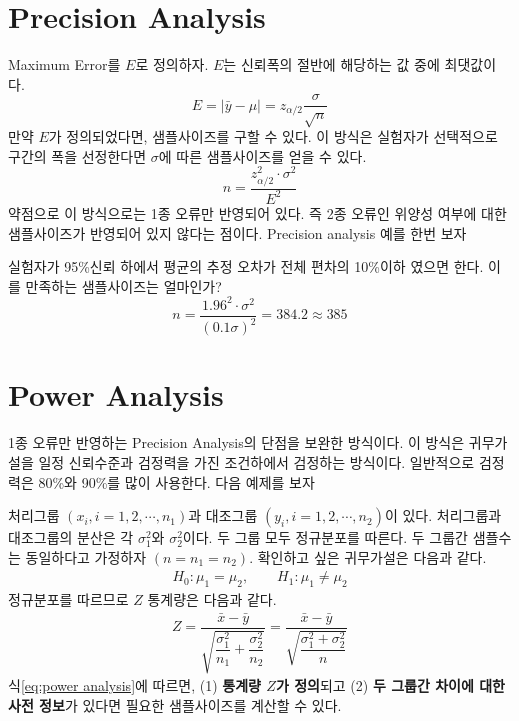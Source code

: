 \section{Precision Analysis}
Maximum Error를 $E$로 정의하자. $E$는 신뢰폭의 절반에 해당하는 값 중에 최댓값이다. 
\begin{equation}
    E = |\bar{y} - \mu| = z_{\alpha/2}\dfrac{\sigma}{\sqrt{n}}
\end{equation}
만약 $E$가 정의되었다면, 샘플사이즈를 구할 수 있다. 이 방식은 실험자가 선택적으로 구간의 폭을 선정한다면 $\sigma$에 따른 샘플사이즈를 얻을 수 있다. 
\begin{equation}
    n = \dfrac{z_{\alpha/2}^2\cdot \sigma^2}{E^2}
\end{equation}
약점으로 이 방식으로는 1종 오류만 반영되어 있다. 즉 2종 오류인 위양성 여부에 대한 샘플사이즈가 반영되어 있지 않다는 점이다. Precision analysis 예를 한번 보자 
\begin{tcolorbox}[arc=4mm, boxrule=0.1mm]
    [예제] 실험자가 95\%신뢰 하에서 평균의 추정 오차가 전체 편차의 10\%이하 였으면 한다. 이를 만족하는 샘플사이즈는 얼마인가? 
    \begin{equation*}
        n = \dfrac{1.96^2\cdot \sigma^2}{(0.1\sigma)^2} = 384.2 \approx 385
    \end{equation*}
\end{tcolorbox}
\section{Power Analysis}
1종 오류만 반영하는 Precision Analysis의 단점을 보완한 방식이다. 이 방식은 귀무가설을 일정 신뢰수준과 검정력을 가진 조건하에서 검정하는 방식이다. 일반적으로 검정력은 80\%와 90\%를 많이 사용한다. 다음 예제를 보자
\begin{tcolorbox}[arc=4mm, boxrule=0.1mm, breakable]
    [예제] 처리그룹 $(x_i, i =1, 2, \cdots, n_1)$과 대조그룹 $(y_i, i =1, 2, \cdots, n_2)$이 있다. 처리그룹과 대조그룹의 분산은 각 $\sigma_1^2$와 $\sigma^2_2$이다. 두 그룹 모두 정규분포를 따른다. 두 그룹간 샘플수는 동일하다고 가정하자 $(n = n_1 = n_2)$. 확인하고 싶은 귀무가설은 다음과 같다. 
    \begin{align*}
        H_0 : \mu_1 = \mu_2, \qquad H_1 : \mu_1 \neq \mu_2
    \end{align*}
    정규분포를 따르므로 $Z$ 통계량은 다음과 같다. 
    \begin{align}
    \label{eq:power analysis}
        Z = \dfrac{\bar{x} - \bar{y}}{\sqrt{\dfrac{\sigma_1^2}{n_1}+\dfrac{\sigma_2^2}{n_2}}} 
          =\dfrac{\bar{x} - \bar{y}}{\sqrt{\dfrac{\sigma_1^2+\sigma_2^2}{n}}}  
    \end{align}
    식\ref{eq:power analysis}에 따르면, (1) \textbf{통계량 $Z$가 정의}되고 (2) \textbf{두 그룹간 차이에 대한 사전 정보}가 있다면 필요한 샘플사이즈를 계산할 수 있다. 
\end{tcolorbox}